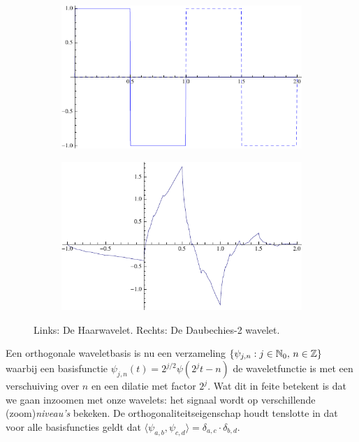\begin{figure}[h]
  \centering
  \begin{subfigure}{0.32\linewidth}
    \includegraphics[width=\linewidth]{plaatjes/db1.pdf}
  \end{subfigure}
  \begin{subfigure}{0.32\linewidth}
    \includegraphics[width=\linewidth]{plaatjes/db2_psi.pdf}
  \end{subfigure}
  \caption{Links: De Haarwavelet. Rechts: De Daubechies-2 wavelet.}
\label{fig:samenv}
\end{figure}

Een orthogonale waveletbasis is nu een verzameling $\{ \psi_{j,n}: j \in \mathbb{N}_0,\, n \in \mathbb{Z} \}$ waarbij een basisfunctie \mbox{$\psi_{j,n}(t) = 2^{j/2} \psi(2^jt - n)$} de waveletfunctie is met een verschuiving over $n$ en een dilatie met factor $2^j$. Wat dit in feite betekent is dat we gaan inzoomen met onze wavelets: het signaal wordt op verschillende (zoom)\emph{niveau's} bekeken. De orthogonaliteitseigenschap houdt tenslotte in dat voor alle basisfuncties geldt dat $\langle \psi_{a,b}, \psi_{c,d} \rangle = \delta_{a,c} \cdot \delta_{b,d}$.

